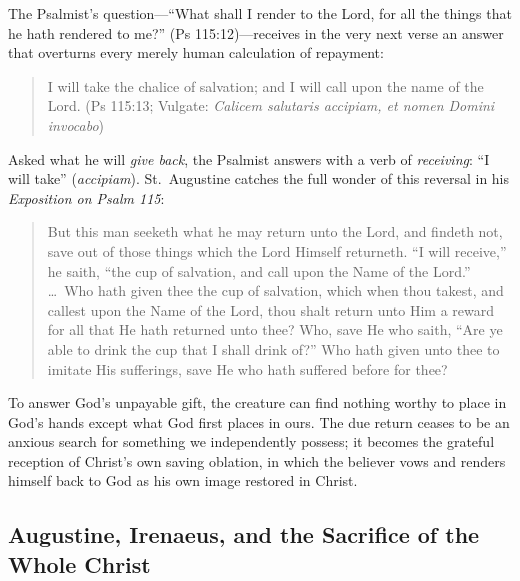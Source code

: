 The Psalmist's question---``What shall I render to the Lord, for all the things that he hath rendered to me?'' (Ps 115:12)---receives in the very next verse an answer that overturns every merely human calculation of repayment:

\begin{quote}
I will take the chalice of salvation; and I will call upon the name of the Lord. (Ps 115:13; Vulgate: \emph{Calicem salutaris accipiam, et nomen Domini invocabo})
\end{quote}

Asked what he will \emph{give back}, the Psalmist answers with a verb of \emph{receiving}: ``I will take'' (\emph{accipiam}). St.\ Augustine catches the full wonder of this reversal in his \emph{Exposition on Psalm 115}:

\begin{quote}
But this man seeketh what he may return unto the Lord, and findeth not, save out of those things which the Lord Himself returneth. ``I will receive,'' he saith, ``the cup of salvation, and call upon the Name of the Lord.'' \dots\ Who hath given thee the cup of salvation, which when thou takest, and callest upon the Name of the Lord, thou shalt return unto Him a reward for all that He hath returned unto thee? Who, save He who saith, ``Are ye able to drink the cup that I shall drink of?'' Who hath given unto thee to imitate His sufferings, save He who hath suffered before for thee?
\end{quote}

To answer God's unpayable gift, the creature can find nothing worthy to place in God's hands except what God first places in ours. The due return ceases to be an anxious search for something we independently possess; it becomes the grateful reception of Christ's own saving oblation, in which the believer vows and renders himself back to God as his own image restored in Christ.

\subsection{Augustine, Irenaeus, and the Sacrifice of the Whole Christ}

